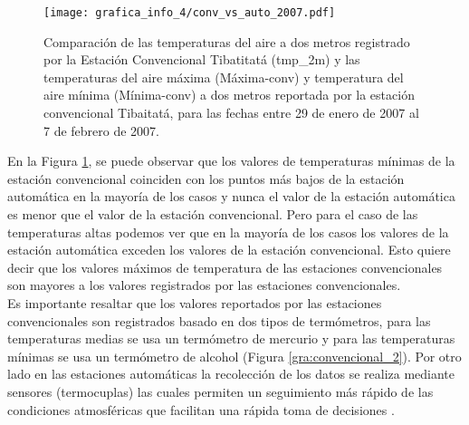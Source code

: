  \begin{figure}[H]
	\begin{center}
	\texttt{[image: grafica\_info\_4/conv\_vs\_auto\_2007.pdf]}
		\caption{Comparación de las temperaturas del aire a dos metros registrado por la Estación Convencional Tibatitatá (tmp\_2m) y las temperaturas del aire máxima (Máxima-conv) y temperatura del aire mínima (Mínima-conv) a dos metros reportada por la estación convencional Tibaitatá, para las fechas entre 29 de enero de 2007 al 7 de febrero de 2007.}
		\label{subfig:b1}
	\end{center}
\end{figure}

 En la Figura \ref{subfig:b1}, se puede observar que los valores de temperaturas mínimas de la estación convencional coinciden con los puntos más bajos de la estación automática en la mayoría de los casos y nunca el valor de la estación automática es menor que el valor de la estación convencional. Pero para el caso de las temperaturas altas podemos ver que en la mayoría de los casos los valores de la estación automática exceden los valores de la estación convencional. Esto quiere decir que los valores máximos de temperatura de las estaciones convencionales son mayores a los valores registrados por las estaciones convencionales.\\
 
 Es importante resaltar que los valores reportados por las estaciones convencionales son registrados basado en dos tipos de termómetros, para las temperaturas medias se usa un termómetro de mercurio y para las temperaturas mínimas se usa un termómetro de alcohol \citep{augter2013vergleich} (Figura \ref{gra:convencional_2}). Por otro lado en las estaciones automáticas la recolección de los datos se realiza mediante sensores (termocuplas) las cuales permiten un seguimiento más rápido de las condiciones atmosféricas que facilitan una rápida toma de decisiones \citep{Soares2017}.\\
 
%




